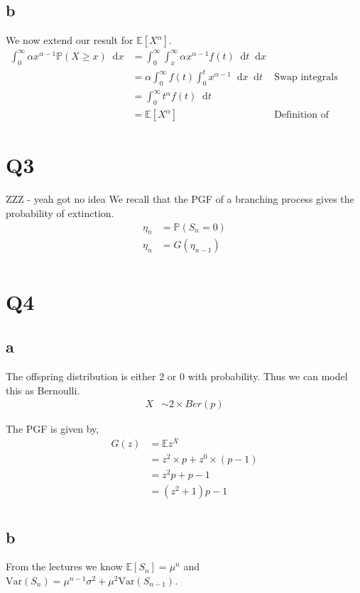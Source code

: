 \documentclass{article}
\newcommand{\diff}{\mathop{}\!\mathrm{d}}
\newcommand{\prob}{\mathbb{P}}
\newcommand{\expect}{\mathbb{E}}
\newcommand{\var}{\text{Var}}
\begin{document}
\subsection{b}
We now extend our result for $\expect\left[X^\alpha\right]$.
\begin{align*}
    \int_0^\infty \alpha x^{\alpha-1} \prob(X \geq x) \diff x
    &= \int_0^\infty \int_x^\infty \alpha x^{\alpha-1} f(t) \diff t \diff x \\
    &= \alpha \int_0^\infty f(t) \int_0^t x^{\alpha-1} \diff x \diff t
    & \text{Swap integrals} \\
    &= \int_0^\infty t^\alpha f(t) \diff t \\
    &= \expect \left[X^\alpha\right] & \text{Definition of expectation}
\end{align*}

\section{Q3}
ZZZ - yeah got no idea
We recall that the PGF of a branching process gives the probability of
extinction.
\begin{align*}
    \eta_n &= \prob(S_n = 0) \\
    \eta_n &= G(\eta_{n-1}) \\
\end{align*}

\section{Q4}
\subsection{a}
The offspring distribution is either 2 or 0 with probability. Thus we can
model this as Bernoulli.
\begin{align*}
    X &\sim 2 \times Ber(p)
\end{align*}

The PGF is given by,
\begin{align*}
    G(z) &= \expect z^X \\
    &= z^2 \times p + z^0 \times (p-1) \\
    &= z^2 p + p - 1 \\
    &= \left(z^2 + 1\right) p - 1 \\
\end{align*}

\subsection{b}
From the lectures we know $\expect[S_n] = \mu^n$ and
$\var(S_n) = \mu^{n-1} \sigma^2 + \mu^2 \var(S_{n-1})$.
\end{document}
